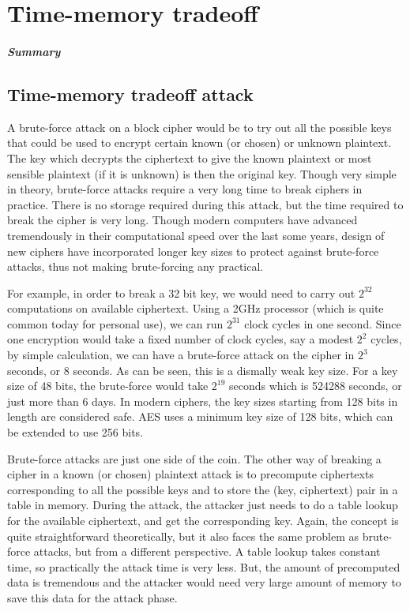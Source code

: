 \chapter{Time-memory tradeoff}

\paragraph{Summary}


\section{Time-memory tradeoff attack}

A brute-force attack on a block cipher would be to try out all the possible keys that could be used to encrypt certain known (or chosen) or unknown plaintext. The key which decrypts the ciphertext to give the known plaintext or most sensible plaintext (if it is unknown) is then the original key. Though very simple in theory, brute-force attacks require a very long time to break ciphers in practice. There is no storage required during this attack, but the time required to break the cipher is very long. Though modern computers have advanced tremendously in their computational speed over the last some years, design of new ciphers have incorporated longer key sizes to protect against brute-force attacks, thus not making brute-forcing any practical.

For example, in order to break a 32 bit key, we would need to carry out $2^{32}$ computations on available ciphertext. Using a 2GHz processor (which is quite common today for personal use), we can run $2^{31}$ clock cycles in one second. Since one encryption would take a fixed number of clock cycles, say a modest $2^2$ cycles, by simple calculation, we can have a brute-force attack on the cipher in $2^3$ seconds, or 8 seconds. As can be seen, this is a dismally weak key size. For a key size of 48 bits, the brute-force would take $2^{19}$ seconds which is 524288 seconds, or just more than 6 days. In modern ciphers, the key sizes starting from 128 bits in length are considered safe. AES uses a minimum key size of 128 bits, which can be extended to use 256 bits. 

Brute-force attacks are just one side of the coin. The other way of breaking a cipher in a known (or chosen) plaintext attack is to precompute ciphertexts corresponding to all the possible keys and to store the (key, ciphertext) pair in a table in memory. During the attack, the attacker just needs to do a table lookup for the available ciphertext, and get the corresponding key. Again, the concept is quite straightforward theoretically, but it also faces the same problem as brute-force attacks, but from a different perspective. A table lookup takes constant time, so practically the attack time is very less. But, the amount of precomputed data is tremendous and the attacker would need very large amount of memory to save this data for the attack phase. 

